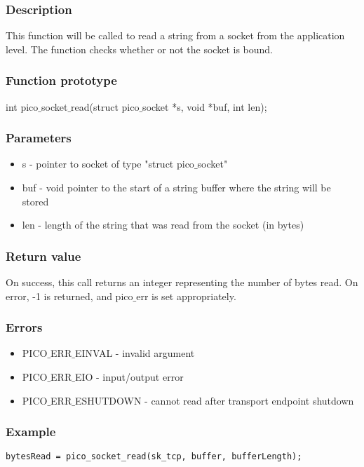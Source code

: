 \subsubsection*{Description}
This function will be called to read a string from a socket from the application level. The function checks whether or not the socket is bound.

\subsubsection*{Function prototype}
int pico$\_$socket$\_$read(struct pico$\_$socket *s, void *buf, int len);

\subsubsection*{Parameters}
\begin{itemize}
\item s - pointer to socket of type "struct pico$\_$socket"
\item buf - void pointer to the start of a string buffer where the string will be stored
\item len - length of the string that was read from the socket (in bytes)
\end{itemize}

\subsubsection*{Return value}
On success, this call returns an integer representing the number of bytes read. On error, -1 is returned, and pico$\_$err is set appropriately.

\subsubsection*{Errors}
\begin{itemize}
\item PICO$\_$ERR$\_$EINVAL - invalid argument
\item PICO$\_$ERR$\_$EIO - input/output error
\item PICO$\_$ERR$\_$ESHUTDOWN - cannot read after transport endpoint shutdown
\end{itemize}

\subsubsection*{Example}
\begin{verbatim}
bytesRead = pico_socket_read(sk_tcp, buffer, bufferLength);
\end{verbatim}


